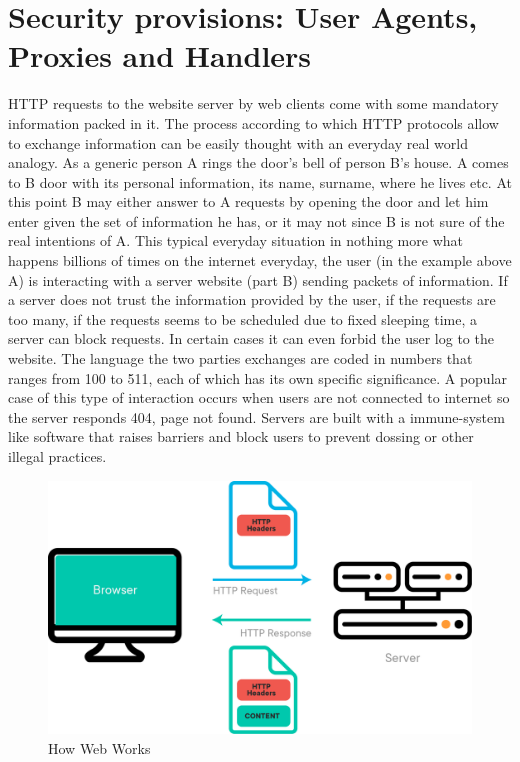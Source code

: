 \documentclass[
  12pt,
  a4paper,
  oneside]{book}
\begin{document}
\hypertarget{security-provisions-user-agents-proxies-and-handlers}{%
\section{Security provisions: User Agents, Proxies and Handlers}\label{security-provisions-user-agents-proxies-and-handlers}}

HTTP requests to the website server by web clients come with some mandatory information packed in it. The process according to which HTTP protocols allow to exchange information can be easily thought with an everyday real world analogy. As a generic person A rings the door's bell of person B's house. A comes to B door with its personal information, its name, surname, where he lives etc. At this point B may either answer to A requests by opening the door and let him enter given the set of information he has, or it may not since B is not sure of the real intentions of A. This typical everyday situation in nothing more what happens billions of times on the internet everyday, the user (in the example above A) is interacting with a server website (part B) sending packets of information. If a server does not trust the information provided by the user, if the requests are too many, if the requests seems to be scheduled due to fixed sleeping time, a server can block requests. In certain cases it can even forbid the user log to the website. The language the two parties exchanges are coded in numbers that ranges from 100 to 511, each of which has its own specific significance. A popular case of this type of interaction occurs when users are not connected to internet so the server responds 404, page not found. Servers are built with a immune-system like software that raises barriers and block users to prevent dossing or other illegal practices.

\begin{figure}
\centering
\includegraphics{images/how_web_works.png}
\caption{How Web Works}
\end{figure}
\end{document}
